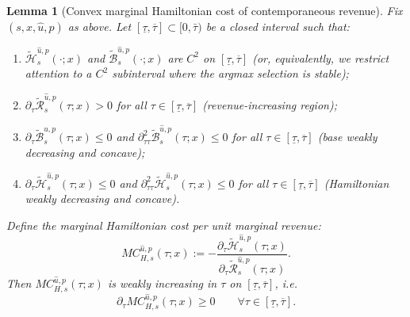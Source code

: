 \documentclass{article}
\newtheorem{lemma}{Lemma}
\begin{document}
\begin{lemma}[Convex marginal Hamiltonian cost of contemporaneous revenue]\label{lem:DWLH}
Fix $(s,x,\hat u,p)$ as above. Let $[\underline\tau,\overline\tau]\subset[0,\bar\tau)$ be a closed interval such that:
\begin{enumerate}[leftmargin=2em,label=(A\arabic*)]
\item $\widetilde{\mathcal H}_s^{\hat u,p}(\cdot;x)$ and $\widetilde{\mathcal B}_s^{\hat u,p}(\cdot;x)$ are $C^2$ on
      $[\underline\tau,\overline\tau]$ (or, equivalently, we restrict attention to a $C^2$ subinterval where the argmax selection is stable);
\item $\partial_\tau \widetilde{\mathcal R}_s^{\hat u,p}(\tau;x)>0$ for all $\tau\in[\underline\tau,\overline\tau]$ (revenue-increasing region);
\item $\partial_\tau \widetilde{\mathcal B}_s^{\hat u,p}(\tau;x)\le 0$ and $\partial^2_{\tau\tau}\widetilde{\mathcal B}_s^{\hat u,p}(\tau;x)\le 0$
      for all $\tau\in[\underline\tau,\overline\tau]$ (base weakly decreasing and concave);
\item $\partial_\tau \widetilde{\mathcal H}_s^{\hat u,p}(\tau;x)\le 0$ and $\partial^2_{\tau\tau}\widetilde{\mathcal H}_s^{\hat u,p}(\tau;x)\le 0$
      for all $\tau\in[\underline\tau,\overline\tau]$ (Hamiltonian weakly decreasing and concave).
\end{enumerate}
Define the marginal Hamiltonian cost per unit marginal revenue:
\[
MC_{H,s}^{\hat u,p}(\tau;x)
:=
-\frac{\partial_\tau \widetilde{\mathcal H}_s^{\hat u,p}(\tau;x)}
{\partial_\tau \widetilde{\mathcal R}_s^{\hat u,p}(\tau;x)}.
\]
Then $MC_{H,s}^{\hat u,p}(\tau;x)$ is weakly increasing in $\tau$ on $[\underline\tau,\overline\tau]$, i.e.
\[
\partial_\tau MC_{H,s}^{\hat u,p}(\tau;x)\ge 0
\qquad\forall \tau\in[\underline\tau,\overline\tau].
\]
\end{lemma}
\end{document}
